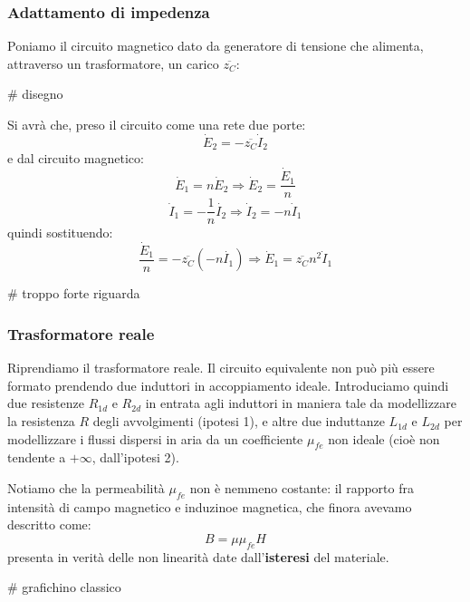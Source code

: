 \documentclass[a4paper,11pt]{article}
\begin{document}
\subsubsection{Adattamento di impedenza}

Poniamo il circuito magnetico dato da generatore di tensione che alimenta, attraverso un trasformatore, un carico $\overline{z_C}$:

# disegno

Si avrà che, preso il circuito come una rete due porte:
$$
\dot{E}_2 = - \overline{z_C} \dot{I}_2
$$
e dal circuito magnetico:
$$
\dot{E}_1 = n \dot{E}_2 \Rightarrow \dot{E}_2 = \frac{\dot{E}_1}{n}
$$
$$
\dot{I}_1 = -\frac{1}{n} \dot{I_2} \Rightarrow \dot{I}_2 = -n \dot{I}_1
$$
quindi sostituendo:
$$
\frac{\dot{E}_1}{n} = - \overline{z_C} (-n \dot{I_1}) \Rightarrow \dot{E}_1 = \overline{z_C} n^2 \dot{I}_1
$$

# troppo forte riguarda

\subsubsection{Trasformatore reale}
Riprendiamo il trasformatore reale.
Il circuito equivalente non può più essere formato prendendo due induttori in accoppiamento ideale.
Introduciamo quindi due resistenze $R_{1d}$ e $R_{2d}$ in entrata agli induttori in maniera tale da modellizzare la resistenza $R$ degli avvolgimenti (ipotesi 1), e altre due induttanze $L_{1d}$ e $L_{2d}$ per modellizzare i flussi dispersi in aria da un coefficiente $\mu_{fe}$ non ideale (cioè non tendente a $+\infty$, dall'ipotesi 2).

Notiamo che la permeabilità $\mu_{fe}$ non è nemmeno costante: il rapporto fra intensità di campo magnetico e induzinoe magnetica, che finora avevamo descritto come:
$$
B = \mu \mu_{fe} H
$$
presenta in verità delle non linearità date dall'\textbf{isteresi} del materiale.

# grafichino classico 
\end{document}
